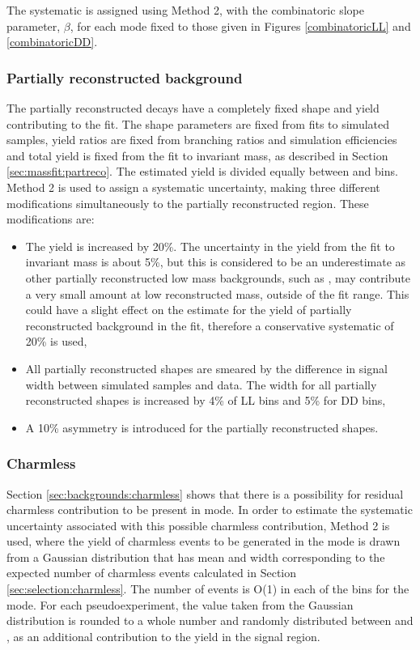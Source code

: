 The systematic is assigned using Method 2, with the combinatoric slope parameter, $\beta$, for each \Dz mode fixed to those given in Figures \ref{combinatoricLL} and \ref{combinatoricDD}.

\subsubsection{Partially reconstructed background}
\label{sec:systematics:partreco}

The partially reconstructed decays have a completely fixed shape and yield contributing to the \CP fit. The shape parameters are fixed from fits to simulated samples, yield ratios are fixed from branching ratios and simulation efficiencies and total yield is fixed from the fit to \kpi invariant mass, as described in Section \ref{sec:massfit:partreco}. The estimated yield is divided equally between \Bp and \Bm bins. Method 2 is used to assign a systematic uncertainty, making three different modifications simultaneously to the partially reconstructed region. These modifications are:

\begin{itemize}
\item The yield is increased by 20\%. The uncertainty in the yield from the fit to \kpi invariant mass is about 5\%, but this is considered to be an underestimate as other partially reconstructed low mass backgrounds, such as \decay{\Bm}{\D\Kstarm\piz}, may contribute a very small amount at low reconstructed \Bm mass, outside of the \CP fit range. This could have a slight effect on the estimate for the yield of partially reconstructed background in the \CP fit, therefore a conservative systematic of 20\% is used,
\item All partially reconstructed shapes are smeared by the difference in signal width between simulated samples and data. The width for all partially reconstructed shapes is increased by 4\% of LL bins and 5\% for DD bins,
\item A 10\% asymmetry is introduced for the partially reconstructed shapes.
\end{itemize}

\subsubsection{Charmless}

Section \ref{sec:backgrounds:charmless} shows that there is a possibility for residual charmless contribution to be present in \pipi mode. In order to estimate the systematic uncertainty associated with this possible charmless contribution, Method 2 is used, where the yield of charmless events to be generated in the \pipi mode is drawn from a Gaussian distribution that has mean and width corresponding to the expected number of charmless events calculated in Section \ref{sec:selection:charmless}. The number of events is O(1) in each of the bins for the \pipi mode. For each pseudoexperiment, the value taken from the Gaussian distribution is rounded to a whole number and randomly distributed between \Bp and \Bm, as an additional contribution to the yield in the signal region. 

